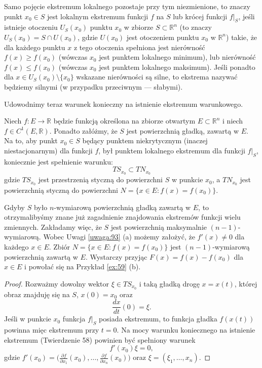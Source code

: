 \documentclass[leqno]{article}
\begin{document}
\begin{justify}
Samo pojęcie ekstremum lokalnego pozostaje przy tym niezmienione, to znaczy punkt $x_0 \in S$ jest lokalnym ekstremum funkcji $f$ na $S$ lub krócej funkcji $f|_S$, jeśli 
istnieje otoczeniu $U_S(x_0)$ punktu $x_0$ w zbiorze $S \subset \mathbb{R}^n$ (to znaczy $U_S(x_0) = S \cap U(x_0)$, gdzie $U(x_0)$ jest otoczeniem punktu $x_0$ w $\mathbb{R}^n$)
takie, że dla każdego punktu $x$ z tego otoczenia spełniona jest nierówność $f(x) \geqslant f(x_0)$ (wówczas $x_0$ jest punktem lokalnego minimum), lub nierówność $f(x) \leqslant f(x_0)$
(wówczas $x_0$ jest punktem lokalnego maksimum). Jeśli ponadto dla $x \in U_S(x_0) \setminus \{x_0\}$ wskazane nierówności są silne, to ekstrema nazywać będziemy silnymi
(w przypadku przeciwnym --- słabymi).

Udowodnimy teraz warunek konieczny na istnienie ekstremum warunkowego.

\begin{theorem}
    {
        Niech $f : E \to \mathbb{R}$ będzie funkcją określona na zbiorze otwartym $E \subset \mathbb{R}^n$ i niech $f \in C^1(E, \mathbb{R})$. Ponadto załóżmy,
        że $S$ jest powierzchnią gładką, zawartą w $E$. Na to, aby punkt $x_0 \in S$ będący punktem niekrytycznym (inaczej niestacjonarnym) dla funkcji $f$, był punktem lokalnego
        ekstremum dla funkcji $f|_S$, koniecznie jest spełnienie warunku:
        \begin{equation}\label{eq:171}
            TS_{x_0} \subset TN_{x_0}
        \end{equation}
        gdzie $TS_{x_0}$ jest przestrzenią styczną do powierzchni $S$ w punkcie $x_0$, a $TN_{x_0}$ jest powierzchnią styczną do powierzchni $N = \{ x \in E : f(x) = f(x_0)\}$.
    }
\end{theorem}

Gdyby $S$ było $n$-wymiarową powierzchnią gładką zawartą w $E$, to otrzymalibyśmy znane już zagadnienie znajdowania ekstremów funkcji wielu zmiennych.
Zakładamy więc, że $S$ jest powierzchnią maksymalnie $(n-1)$-wymiarową. Wobec Uwagi \ref{uwaga:93} (a) możemy założyć, że $f'(x) \neq 0$ dla każdego $x \in E$.
Zbiór $N = \{ x \in E : f(x) = f(x_0)\}$ jest $(n-1)$-wymiarową powierzchnią zawartą w $E$. Wystarczy przyjąc $F(x) = f(x) - f(x_0)$ dla $x \in E$ i powołać się na Przykład \ref{ex:59} (b).

\begin{proof}
    Rozważmy dowolny wektor $\xi \in TS_{x_0}$ i taką gładką drogę $x = x(t)$, której obraz znajduję się na $S$, $x(0) = x_0$ oraz 
    \[
        \frac{dx}{dt}(0) = \xi.
    \]
    Jeśli w punkcie $x_0$ funkcja $f|_S$ posiada ekstremum, to funkcja gładka $f(x(t))$ powinna mięc ekstremum przy $t = 0$. Na mocy warunku koniecznego na istnienie ekstremum
    (Twierdzenie 58) powinien być spełniony warunek 
    \begin{equation}\label{eq:172}
        f'(x_0)\xi = 0,
    \end{equation}
    gdzie $f'(x_0) = \Big(\frac{\partial f}{\partial x_1}(x_0), \ldots, \frac{\partial f}{\partial x_n}(x_0)\Big)$ oraz $\xi = (\xi_1, \ldots, x_n)$.


\end{proof}
\end{justify}
\end{document}
